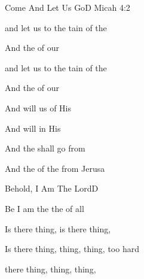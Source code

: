 \documentclass[12pt]{book}
\newcommand{\RevDate}{\today}
\newcommand{\NotCCLIed}{\relax}
\begin{document}
\begin{song}{Come And Let Us Go}{D}
  {}
  {}
  {Micah 4:2}
  {\NotCCLIed}

  \renewcommand{\RevDate}{February~11,~1993}

  \begin{SBOpGroup}
     and let us  to the tain of the 
    
    And  the  of our 
    
     and let us  to the tain of the 
    
    And  the  of our 
    
    And  will  us of His  
    
    And  will  in His  
    
    And the  shall go  from 
    
    And the  of the  from Jerusa
  \end{SBOpGroup}
\end{song}


\begin{song}{Behold, I Am The Lord}{D}
  {}
  {}
  {}
  {\NotCCLIed}

  \renewcommand{\RevDate}{February~11,~1993}

  \begin{SBOpGroup}
    Be I am the  the  of all 
    
    Is there thing, is there thing,    
    
    Is there thing, thing, thing, too hard  
    
     there thing, thing, thing,    
  \end{SBOpGroup}
\end{song}
\end{document}
